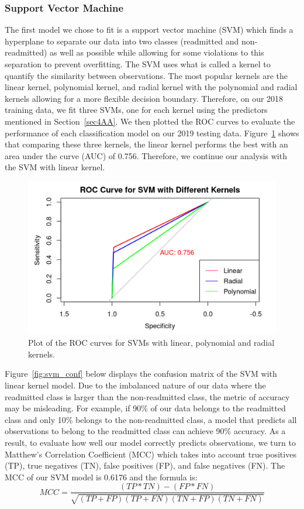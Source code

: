\documentclass[sn-basic,pdflatex]{sn-jnl}
\theoremstyle{remark}
\theoremstyle{definition}
\begin{document}
\hypertarget{sec4AB}{%
\subsubsection{Support Vector Machine}\label{sec4AB}}

The first model we chose to fit is a support vector machine (SVM) which
finds a hyperplane to separate our data into two classes (readmitted and
non-readmitted) as well as possible while allowing for some violations
to this separation to prevent overfitting. The SVM uses what is called a
kernel to quantify the similarity between observations. The most popular
kernels are the linear kernel, polynomial kernel, and radial kernel with
the polynomial and radial kernels allowing for a more flexible decision
boundary. Therefore, on our 2018 training data, we fit three SVMs, one
for each kernel using the predictors mentioned in Section~\ref{sec4AA}.
We then plotted the ROC curves to evaluate the performance of each
classification model on our 2019 testing data. Figure~\ref{fig:svm_roc}
shows that comparing these three kernels, the linear kernel performs the
best with an area under the curve (AUC) of 0.756. Therefore, we continue
our analysis with the SVM with linear kernel.

\begin{figure}[H]

{\centering \includegraphics[width=0.8\linewidth]{figures/svm_roc} 

}

\caption{Plot of the ROC curves for SVMs with linear, polynomial and radial kernels.}\label{fig:svm_roc}
\end{figure}

Figure~\ref{fig:svm_conf} below displays the confusion matrix of the SVM
with linear kernel model. Due to the imbalanced nature of our data where
the readmitted class is larger than the non-readmitted class, the metric
of accuracy may be misleading. For example, if 90\% of our data belongs
to the readmitted class and only 10\% belongs to the non-readmitted
class, a model that predicts all observations to belong to the
readmitted class can achieve 90\% accuracy. As a result, to evaluate how
well our model correctly predicts observations, we turn to Matthew's
Correlation Coefficient (MCC) which takes into account true positives
(TP), true negatives (TN), false positives (FP), and false negatives
(FN). The MCC of our SVM model is 0.6176 and the formula is: \newline \[
MCC = \frac{(TP*TN) - (FP*FN)}{\sqrt{(TP+FP)(TP+FN)(TN+FP)(TN+FN)}}
\]
\end{document}
